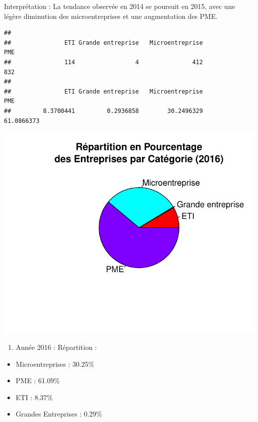 \documentclass[mstat,12pt]{unswthesis}
\begin{document}
Interprétation : La tendance observée en 2014 se poursuit en 2015, avec
une légère diminution des microentreprises et une augmentation des PME.

\medskip

\begin{verbatim}
## 
##               ETI Grande entreprise   Microentreprise               PME 
##               114                 4               412               832 
## 
##               ETI Grande entreprise   Microentreprise               PME 
##         8.3700441         0.2936858        30.2496329        61.0866373
\end{verbatim}

\includegraphics{TDDT_projet_L_2_files/figure-latex/analyse_univariee_2016-1.pdf}

\medskip

\begin{enumerate}
\def\labelenumi{\arabic{enumi})}
\setcounter{enumi}{5}
\tightlist
\item
  Année 2016 : Répartition :
\end{enumerate}

\begin{itemize}
\tightlist
\item
  Microentreprises : 30.25\%
\item
  PME : 61.09\%
\item
  ETI : 8.37\%
\item
  Grandes Entreprises : 0.29\%
\end{itemize}

\medskip
\end{document}
